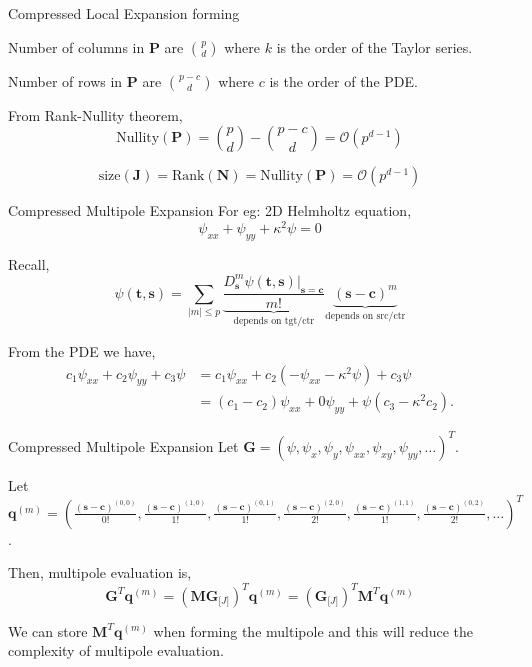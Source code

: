 \documentclass[10pt]{beamer}
\def\b#1{\mathbf{ #1}}
\begin{document}
\begin{frame}[fragile]{Compressed Local Expansion forming}

 Number of columns in $\b P$ are $\binom{p}{d}$ where $k$ is the order of the Taylor series.

 Number of rows in $\b P$ are $\binom{p-c}{d}$ where $c$ is the order of the PDE.

 From Rank-Nullity theorem,
 \[
  \text{Nullity}(\b P) = \binom{p}{d} - \binom{p-c}{d} = \mathcal{O}(p^{d-1})
 \]

 \[
  \text{size}(\b J) = \text{Rank}(\b N) = \text{Nullity}(\b P) = \mathcal{O}(p^{d-1})
 \]

\end{frame}


\begin{frame}[fragile]{Compressed Multipole Expansion}
 For eg: 2D Helmholtz equation,
 \[
  \psi_{x x} + \psi_{y y} + \kappa^2 \psi = 0
 \]

 Recall, 
 \[
 \psi(\b t, \b s) = \sum_{|m| \le p} \underbrace{\frac{D_{\b s}^m \psi(\b t, \b s)\Bigr|_{\b s = \b c}}{m!}}_{\text{depends on tgt/ctr}} \underbrace{(\b s - \b c)^m}_{\text{depends on src/ctr}}
 \]

 From the PDE we have, 
 \begin{align*}
  c_1 \psi_{x x} +  c_2 \psi_{y y} + c_3 \psi 
  &= c_1 \psi_{x x} +  c_2 (-\psi_{x x} - \kappa^2 \psi) + c_3 \psi \\
  &= (c_1 - c_2) \psi_{x x} + 0 \psi_{y y} +\psi (c_3 - \kappa^2 c_2).
 \end{align*}
\end{frame}

\begin{frame}[fragile]{Compressed Multipole Expansion}
 Let $\b G = (\psi, \psi_{x}, \psi_{y}, \psi_{x x}, \psi_{x y}, \psi_{y y}, \ldots)^T$.

 Let $\b q^{(m)} = (\frac{(\b s - \b c)^{(0, 0)}}{0!}, \frac{(\b s - \b c)^{(1, 0)}}{1!}, \frac{(\b s - \b c)^{(0, 1)}}{1!}, \frac{(\b s - \b c)^{(2, 0)}}{2!}, \frac{(\b s - \b c)^{(1, 1)}}{1!}, \frac{(\b s - \b c)^{(0, 2)}}{2!}, \ldots)^T$.
 
 Then, multipole evaluation is,
 \[
  \b G^T \b q^{(m)} = (\b M \b G_{\b [J]} )^T \b q^{(m)} = ( \b G_{\b [J]} )^T \b M^T \b q^{(m)}
 \]
 
 We can store $\b M^T \b q^{(m)}$ when forming the multipole and this will reduce the complexity of multipole evaluation.

\end{frame}
\end{document}
